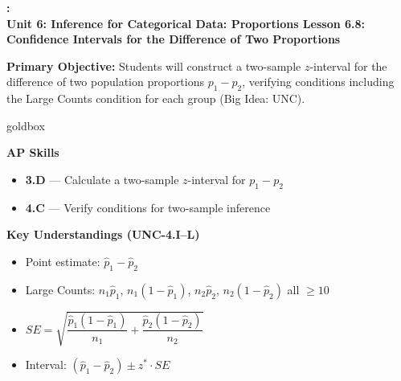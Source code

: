 \documentclass[10pt]{article}
\newcommand{\UnitNumberName}{Unit 6: Inference for Categorical Data: Proportions \quad}
\newcommand{\LessonNumberName}{Lesson 6.8: Confidence Intervals for the Difference of Two Proportions}
\begin{document}
\begin{center}
    {\Large\bfseries \CourseName: \SchoolYear \\
    {\small\bfseries \UnitNumberName \LessonNumberName}}
\end{center}

\begin{tcolorbox}[colback=sky, colframe=navy, boxrule=0.9pt, arc=2mm,
    left=2mm, right=2mm, top=1.5mm, bottom=1.5mm]
    \textbf{Primary Objective:} Students will construct a two-sample $z$-interval for the
    difference of two population proportions $p_1 - p_2$, verifying conditions including the
    Large Counts condition for each group (Big Idea: UNC).
\end{tcolorbox}

\renewcommand{\arraystretch}{1.6}
\begin{skillbox}{goldbox}
    \begin{minipage}[t]{0.48\linewidth}\vspace{0pt}
        \textbf{AP Skills}
        \begin{itemize}[leftmargin=1.2em]
            \item \textbf{3.D} --- Calculate a two-sample $z$-interval for $p_1 - p_2$
            \item \textbf{4.C} --- Verify conditions for two-sample inference
        \end{itemize}
    \end{minipage}\hfill
    \begin{minipage}[t]{0.48\linewidth}\vspace{0pt}
        \textbf{Key Understandings (UNC-4.I--L)}
        \begin{itemize}[leftmargin=1.2em]
            \item Point estimate: $\hat p_1 - \hat p_2$
            \item Large Counts: $n_1\hat p_1$, $n_1(1-\hat p_1)$, $n_2\hat p_2$, $n_2(1-\hat p_2)$ all $\ge 10$
            \item $SE = \sqrt{\dfrac{\hat p_1(1-\hat p_1)}{n_1} + \dfrac{\hat p_2(1-\hat p_2)}{n_2}}$
            \item Interval: $(\hat p_1-\hat p_2) \pm z^*\cdot SE$
        \end{itemize}
    \end{minipage}
\end{skillbox}
\end{document}
